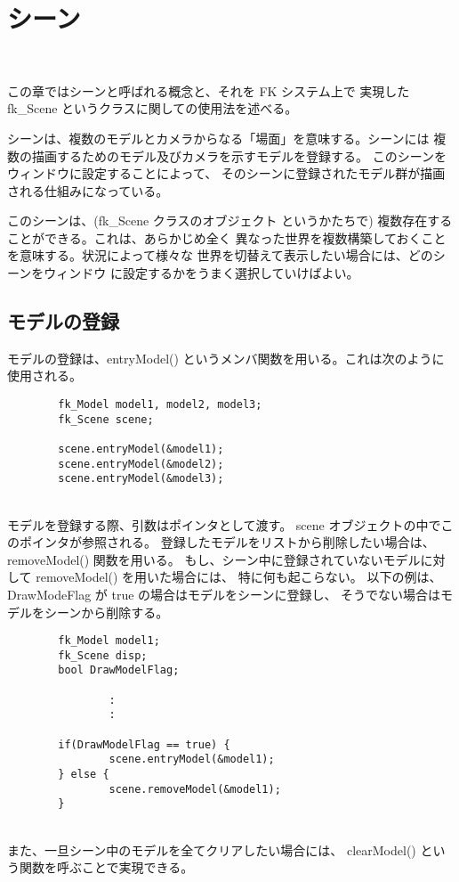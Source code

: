 \chapter{シーン} \label{chap:scene} ~

この章ではシーンと呼ばれる概念と、それを FK システム上で
実現した fk\_Scene というクラスに関しての使用法を述べる。

シーンは、複数のモデルとカメラからなる「場面」を意味する。シーンには
複数の描画するためのモデル及びカメラを示すモデルを登録する。
このシーンをウィンドウに設定することによって、
そのシーンに登録されたモデル群が描画される仕組みになっている。

このシーンは、(fk\_Scene クラスのオブジェクト
というかたちで) 複数存在することができる。これは、あらかじめ全く
異なった世界を複数構築しておくことを意味する。状況によって様々な
世界を切替えて表示したい場合には、どのシーンをウィンドウ
に設定するかをうまく選択していけばよい。

\section{モデルの登録}
モデルの登録は、entryModel() というメンバ関数を用いる。これは次のように
使用される。
\\
\begin{breakbox}
\begin{verbatim}
        fk_Model model1, model2, model3;
        fk_Scene scene;

        scene.entryModel(&model1);
        scene.entryModel(&model2);
        scene.entryModel(&model3);
\end{verbatim}
\end{breakbox}
~ \\
モデルを登録する際、引数はポインタとして渡す。
scene オブジェクトの中でこのポインタが参照される。
登録したモデルをリストから削除したい場合は、removeModel() 関数を用いる。
もし、シーン中に登録されていないモデルに対して removeModel() を用いた場合には、
特に何も起こらない。
以下の例は、DrawModeFlag が true の場合はモデルをシーンに登録し、
そうでない場合はモデルをシーンから削除する。
\\
\begin{breakbox}
\begin{verbatim}
        fk_Model model1;
        fk_Scene disp;
        bool DrawModelFlag;

                :
                :

        if(DrawModelFlag == true) {
                scene.entryModel(&model1);
        } else {
                scene.removeModel(&model1);
        }
\end{verbatim}
\end{breakbox}
~ \\
また、一旦シーン中のモデルを全てクリアしたい場合には、
clearModel() という関数を呼ぶことで実現できる。

